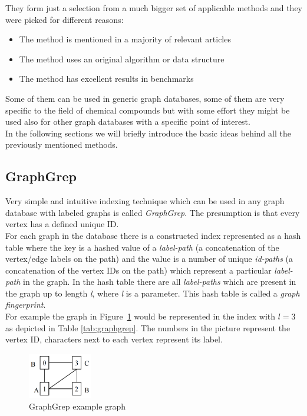 They form just a selection from a much bigger set of applicable methods and they were picked for different reasons:

\begin{itemize}
	\item The method is mentioned in a majority of relevant articles
	\item The method uses an original algorithm or data structure
	\item The method has excellent results in benchmarks
\end{itemize}

Some of them can be used in generic graph databases, some of them are very specific to the field of chemical compounds but with some effort they might be used also for other graph databases with a specific point of interest.\\

In the following sections we will briefly introduce the basic ideas behind all the previously mentioned methods.

\subsection{GraphGrep}

Very simple and intuitive indexing technique which can be used in any graph database with labeled graphs is called \textit{GraphGrep}. The presumption is that every vertex has a defined unique ID.\\

For each graph in the database there is a constructed index represented as a hash table where the key is a hashed value of a \textit{label-path} (a concatenation of the vertex/edge labels on the path) and the value is a number of unique \textit{id-paths} (a concatenation of the vertex IDs on the path) which represent a particular \textit{label-path} in the graph. In the hash table there are all \textit{label-paths} which are present in the graph up to length \textit{l}, where \textit{l} is a parameter. This hash table is called a \textit{graph fingerprint}.\\

For example the graph in Figure~\ref{fig:graphgrep} would be represented in the index with $l=3$ as depicted in Table \ref{tab:graphgrep}. The numbers in the picture represent the vertex ID, characters next to each vertex represent its label.

\begin{figure}[h]
	\centering
	\includegraphics[width=0.25\textwidth]{../img/graphgrep.pdf}
	\caption{GraphGrep example graph}
	\label{fig:graphgrep}
\end{figure}

